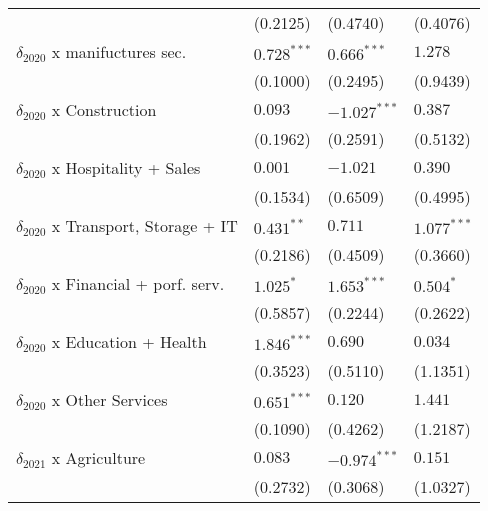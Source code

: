 \begin{tabular}{llll}
                                                   &           (0.2125) &           (0.4740) &           (0.4076) \\
$\delta_{2020}$ x manifuctures sec.                &      $0.728^{***}$ &      $0.666^{***}$ &            $1.278$ \\
                                                   &           (0.1000) &           (0.2495) &           (0.9439) \\
$\delta_{2020}$ x Construction                     &            $0.093$ &     $-1.027^{***}$ &            $0.387$ \\
                                                   &           (0.1962) &           (0.2591) &           (0.5132) \\
$\delta_{2020}$ x Hospitality + Sales              &            $0.001$ &           $-1.021$ &            $0.390$ \\
                                                   &           (0.1534) &           (0.6509) &           (0.4995) \\
$\delta_{2020}$ x Transport, Storage + IT          &       $0.431^{**}$ &            $0.711$ &      $1.077^{***}$ \\
                                                   &           (0.2186) &           (0.4509) &           (0.3660) \\
$\delta_{2020}$ x Financial + porf. serv.          &          $1.025^*$ &      $1.653^{***}$ &          $0.504^*$ \\
                                                   &           (0.5857) &           (0.2244) &           (0.2622) \\
$\delta_{2020}$ x Education + Health               &      $1.846^{***}$ &            $0.690$ &            $0.034$ \\
                                                   &           (0.3523) &           (0.5110) &           (1.1351) \\
$\delta_{2020}$ x Other Services                   &      $0.651^{***}$ &            $0.120$ &            $1.441$ \\
                                                   &           (0.1090) &           (0.4262) &           (1.2187) \\
$\delta_{2021}$ x Agriculture                      &            $0.083$ &     $-0.974^{***}$ &            $0.151$ \\
                                                   &           (0.2732) &           (0.3068) &           (1.0327) \\

\end{tabular}
